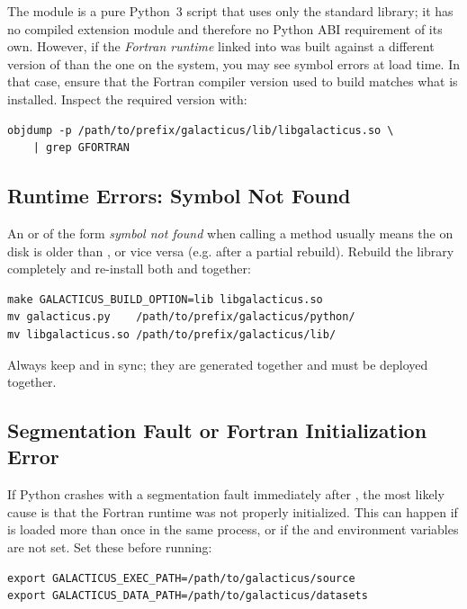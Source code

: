 The  module is a pure Python~3 script that uses only the standard library; it has no compiled extension module and therefore no Python ABI requirement of its own. However, if the \emph{Fortran runtime} linked into  was built against a different version of  than the one on the system, you may see symbol errors at load time. In that case, ensure that the Fortran compiler version used to build  matches what is installed. Inspect the required  version with:
\begin{verbatim}
objdump -p /path/to/prefix/galacticus/lib/libgalacticus.so \
    | grep GFORTRAN
\end{verbatim}

\subsection{Runtime Errors: Symbol Not Found}\label{sec:pythonInterface:troubleshooting:symbol}

An  or  of the form \emph{symbol not found} when calling a method usually means the  on disk is older than , or vice versa (e.g. after a partial rebuild). Rebuild the library completely and re-install both  and  together:
\begin{verbatim}
make GALACTICUS_BUILD_OPTION=lib libgalacticus.so
mv galacticus.py    /path/to/prefix/galacticus/python/
mv libgalacticus.so /path/to/prefix/galacticus/lib/
\end{verbatim}
Always keep  and  in sync; they are generated together and must be deployed together.

\subsection{Segmentation Fault or Fortran Initialization Error}\label{sec:pythonInterface:troubleshooting:init}

If Python crashes with a segmentation fault immediately after , the most likely cause is that the Fortran runtime was not properly initialized. This can happen if  is loaded more than once in the same process, or if the  and  environment variables are not set. Set these before running:
\begin{verbatim}
export GALACTICUS_EXEC_PATH=/path/to/galacticus/source
export GALACTICUS_DATA_PATH=/path/to/galacticus/datasets
\end{verbatim}

